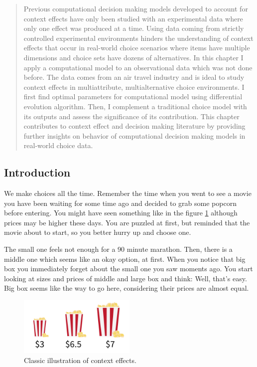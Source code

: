 \documentclass[a4paper,12pt]{article}
\begin{document}
\begin{abstract}
    
    Previous computational decision making models developed to account for context effects have only been
    studied with an experimental data where only one effect was produced at a time. Using data coming from strictly controlled experimental environments
    hinders the understanding of context effects that occur in real-world choice scenarios where items have multiple dimensions and choice sets have dozens of alternatives. In this chapter
    I apply a computational model to an observational data which was not done before. The data comes from an air travel industry and is ideal to study context effects in multiattribute, multialternative choice environments. I first find optimal parameters for computational model using differential evolution algorithm. Then, I complement a traditional choice model with its outputs and assess the significance of its contribution. This chapter contributes to context effect and decision making literature by providing further insights on behavior of computational decision making models in real-world choice data.
    
\end{abstract}

\newpage


\subsection{Introduction}

We make choices all the time. Remember the time when you went to see a movie you have been waiting for some time ago and decided to grab some popcorn before entering. You might have seen something like in the figure \ref{fig:decoyPopcornExample}  although prices may be higher these days. You are puzzled at first, but reminded that the movie about to start, so you better hurry up and choose one. 

The small one feels not enough for a 90 minute marathon. Then, there is a middle one which seems like an okay option,  at first. When you notice that big box you immediately forget about the small one you saw moments ago. You start looking at sizes and prices of middle and large box and think: Well, that's easy. Big box seems like the way to go here, considering their prices are almost equal. 


\begin{figure}[H]
    \centering
    \includegraphics[width=0.5\textwidth]{staticFiles/popcornDecoy.png}
    \caption{Classic illustration of context effects.}
    \label{fig:decoyPopcornExample}
\end{figure}
\end{document}
